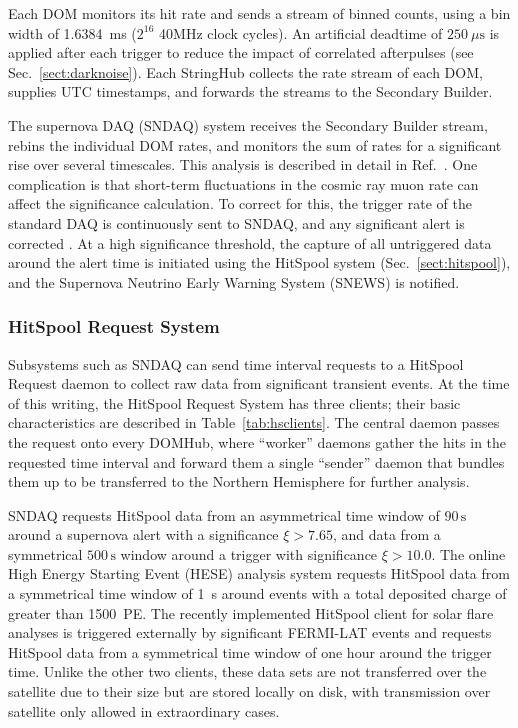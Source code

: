 Each DOM monitors its hit rate and sends a stream of binned counts, using a
bin width of 1.6384~ms ($2^{16}$ 40MHz clock cycles).  An artificial
deadtime of $250\ {\mu}\mathrm{s}$ is applied after each trigger to reduce the
impact of correlated afterpulses (see Sec.~\ref{sect:darknoise}).  Each
StringHub collects the rate stream of each DOM, supplies UTC timestamps,
and forwards the streams to the Secondary Builder.

The supernova DAQ (SNDAQ) system receives the Secondary Builder stream,
rebins the individual DOM rates, and monitors the sum of rates for a
significant rise over several timescales.  This analysis is described in
detail in Ref.~\cite{IC3:supernova}.  One complication is that short-term
fluctuations in the cosmic ray muon rate can affect the significance
calculation.  To correct for this, the trigger rate of the standard DAQ is
continuously sent to SNDAQ, and any significant alert is corrected
\cite{IC3:icrc15_sndaq}.  At a high significance threshold, the capture of
all untriggered data around the alert time is initiated using the HitSpool
system (Sec.~\ref{sect:hitspool}), and the Supernova Neutrino Early Warning
System (SNEWS) \cite{SNEWS} is notified.

\subsubsection{\label{sect:hitspool}HitSpool Request System}

Subsystems such as SNDAQ can send time interval requests to a HitSpool
Request daemon to collect raw data from significant transient events. At
the time of this writing, the HitSpool Request System has three clients;
their basic characteristics are described in
Table~\ref{tab:hsclients}.  The central daemon passes the request onto 
every DOMHub, where ``worker'' daemons gather the hits in the requested time
interval and forward them a single ``sender'' daemon
that bundles them up to be transferred to the Northern Hemisphere for further analysis.

SNDAQ requests HitSpool data from an asymmetrical time window of $90
\,\mathrm{s}$ around a supernova alert with a significance $\xi > 7.65$,
and data from a symmetrical $500\,\mathrm{s}$ window around a trigger with
significance $\xi > 10.0$.  The online High Energy Starting Event (HESE)
analysis system requests HitSpool data from a symmetrical time window of
1~s around events with a total deposited charge of greater than 1500~PE.
The recently implemented HitSpool client for solar flare analyses is
triggered externally by significant FERMI-LAT events and requests HitSpool
data from a symmetrical time window of one hour around the trigger
time. Unlike the other two clients, these data sets are not transferred
over the satellite due to their size but are stored locally on disk, with
transmission over satellite only allowed in extraordinary cases.

